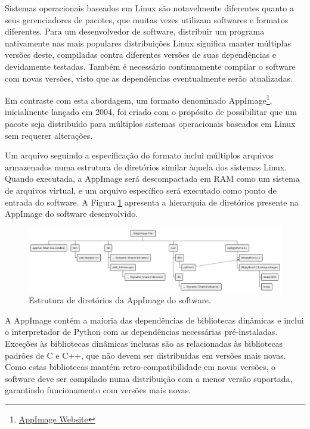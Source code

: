 \documentclass[
	12pt,				%
	openright,			%
	oneside,			%
	a4paper,			%
	main=brazil,
	english,			%
	]{ufsj-abntex2}
\begin{document}
Sistemas operacionais baseados em Linux são notavelmente diferentes quanto a seus gerenciadores de pacotes, que muitas vezes utilizam softwares e formatos diferentes. Para um desenvolvedor de software, distribuir um programa nativamente nas mais populares distribuições Linux significa manter múltiplas versões deste, compiladas contra diferentes versões de suas dependências e devidamente testadas. Também é necessário continuamente compilar o software com novas versões, visto que as dependências eventualmente serão atualizadas.

Em contraste com esta abordagem, um formato denominado AppImage\footnote{\href{https://appimage.org/}{AppImage Website}}, inicialmente lançado em 2004, foi criado com o propósito de possibilitar que um pacote seja distribuído para múltiplos sistemas operacionais baseados em Linux sem requerer alterações.

Um arquivo seguindo a especificação do formato inclui múltiplos arquivos armazenados numa estrutura de diretórios similar àquela dos sistemas Linux. Quando executada, a AppImage será descompactada em RAM como um sistema de arquivos virtual, e um arquivo específico será executado como ponto de entrada do software. A Figura \ref{fig:appimage} apresenta a hierarquia de diretórios presente na AppImage do software desenvolvido.

\begin{figure}[h]
    \centering
    \includegraphics[scale=0.37]{diagrams/img/appimage.png} 
    \caption{Estrutura de diretórios da AppImage do software.}
    \label{fig:appimage}
\end{figure}

A AppImage contém a maioria das dependências de bibliotecas dinâmicas e inclui o interpretador de Python com as dependências necessárias pré-instaladas. Exceções às bibliotecas dinâmicas inclusas são as relacionadas às bibliotecas padrões de C e C++, que não devem ser 
distribuídas em versões mais novas. Como estas bibliotecas mantém retro-compatibilidade em novas versões, o software deve ser compilado numa distribuição com a menor versão suportada, garantindo funcionamento com versões mais novas.
\end{document}
